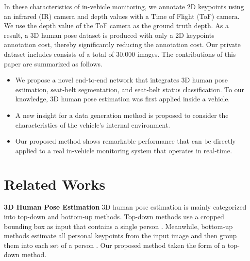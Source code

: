 \documentclass[letterpaper]{article} %
\begin{document}
In these characteristics of in-vehicle monitoring, we annotate 2D keypoints using an infrared (IR) camera and depth values with a Time of Flight (ToF) camera. We use the depth value of the ToF camera as the ground truth depth. As a result, a 3D human pose dataset is produced with only a 2D keypoints annotation cost, thereby significantly reducing the annotation cost. Our private dataset includes consists of a total of 30,000 images. The contributions of this paper are summarized as follows.

\begin{itemize}
\item We propose a novel end-to-end network that integrates 3D human pose estimation, seat-belt segmentation, and seat-belt status classification. To our knowledge, 3D human pose estimation was first applied inside a vehicle.
\item A new insight for a data generation method is proposed to consider the characteristics of the vehicle's internal environment.
\item Our proposed method shows remarkable performance that can be directly applied to a real in-vehicle monitoring system that operates in real-time.
\end{itemize}

\section{Related Works}
\textbf{3D Human Pose Estimation}
3D human pose estimation is mainly categorized into top-down and bottom-up methods. Top-down methods use a cropped bounding box as input that contains a single person \cite{li20143d, sun2017compositional, pavlakos2017coarse, sun2018integral, moon2019camera, martinez2017simple, nie2017monocular, gong2021poseaug, llopart2020liftformer}. Meanwhile, bottom-up methods estimate all personal keypoints from the input image and then group them into each set of a person \cite{fabbri2020compressed, li2020hmor, lin2020hdnet, mehta2020xnect, wang2010combined}. Our proposed method taken the form of a top-down method.
\end{document}
